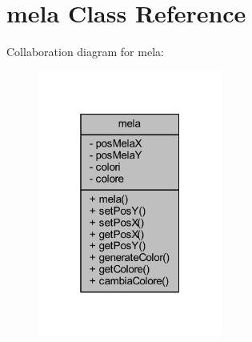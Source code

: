 \hypertarget{class_snake_1_1game_1_1vipera_1_1mela}{}\section{mela Class Reference}
\label{class_snake_1_1game_1_1vipera_1_1mela}


Collaboration diagram for mela\+:
\nopagebreak
\begin{figure}[H]
\begin{center}
\leavevmode
\includegraphics[width=172pt]{class_snake_1_1game_1_1vipera_1_1mela__coll__graph}
\end{center}
\end{figure}
